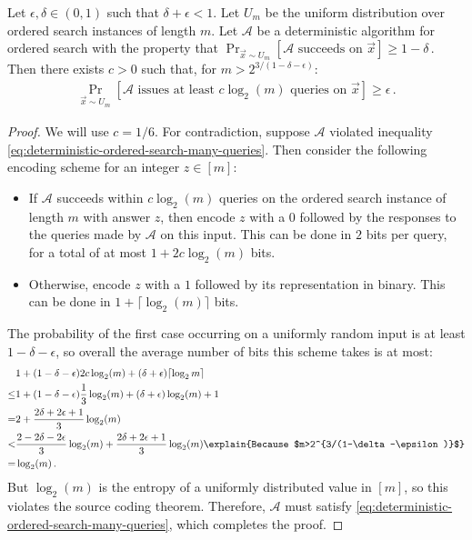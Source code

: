 \documentclass[11pt]{article}
\begin{document}
\begin{lemma}
    \label{lem:ordered-search-lower-bound-deterministic}
    Let $\epsilon, \delta \in (0, 1)$ such that $\delta + \epsilon < 1$. Let $U_m$ be the uniform distribution over ordered search instances of length $m$. Let $\mathcal{A}$ be a deterministic algorithm for ordered search with the property that
     $    \Pr_{\vec{x} \sim U_m}\left[ \mathcal{A} \mbox{ succeeds on } \vec{x} \right] \geq 1-\delta\,. $  
    Then there exists $c > 0$ such that, for $m > 2^{3/(1-\delta-\epsilon)}$: 
    \begin{align}
        \Pr_{\vec{x} \sim U_m} \left[\mathcal{A} \mbox{ issues at least } c \log_2(m) \mbox{ queries on } \vec{x} \right] \geq \epsilon\,.\label{eq:deterministic-ordered-search-many-queries}
    \end{align}
\end{lemma}

\begin{proof}
    We will use $c = 1/6$. For contradiction, suppose $\mathcal{A}$ violated inequality \eqref{eq:deterministic-ordered-search-many-queries}. Then consider the following encoding scheme for an integer $z \in [m]$:
    \begin{itemize}
        \item If $\mathcal{A}$ succeeds within $c \log_2(m)$ queries on the ordered search instance of length $m$ with answer $z$, then encode $z$ with a $0$ followed by the responses to the queries made by $\mathcal{A}$ on this input. This can be done in $2$ bits per query, for a total of at most $1 + 2c \log_2(m)$ bits.
        \item Otherwise, encode $z$ with a $1$ followed by its representation in binary. This can be done in $1 + \lceil \log_2(m) \rceil$ bits.
    \end{itemize}
    The probability of the first case occurring on a uniformly random input is at least $1-\delta-\epsilon$, so overall the average number of bits this scheme takes is at most:
    \begin{align}
        & 1 + (1-\delta-\epsilon) 2c \log_2(m) + (\delta + \epsilon) \lceil \log_2 m \rceil \\
        \leq& 1 + (1-\delta-\epsilon) \frac{1}{3} \log_2(m) + (\delta + \epsilon) \log_2 (m) + 1 \\
        =& 2 + \frac{2\delta + 2\epsilon + 1}{3} \log_2(m) \\
        <& \frac{2-2\delta-2\epsilon}{3} \log_2(m) + \frac{2\delta + 2\epsilon + 1}{3} \log_2(m) \explain{Because $m>2^{3/(1-\delta-\epsilon)}$} \\
        =& \log_2(m) \,.
    \end{align}
    But $\log_2(m)$ is the entropy of a uniformly distributed value in $[m]$, so this violates the source coding theorem. Therefore, $\mathcal{A}$ must satisfy \eqref{eq:deterministic-ordered-search-many-queries}, which completes the proof.
\end{proof}
\end{document}

